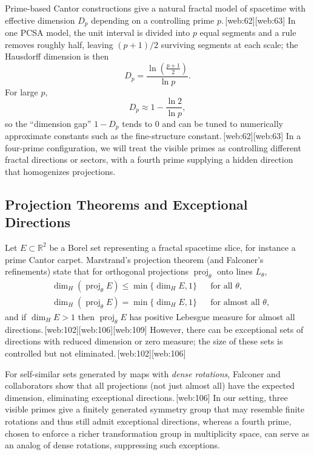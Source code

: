 \documentclass[11pt]{article}
\begin{document}
Prime-based Cantor constructions give a natural fractal model of
spacetime with effective dimension $D_p$ depending on a controlling
prime $p$.\,[web:62][web:63]
In one PCSA model, the unit interval is divided into $p$ equal segments
and a rule removes roughly half, leaving $(p+1)/2$ surviving segments at
each scale; the Hausdorff dimension is then
\begin{equation}
  D_p = \frac{\ln\left(\frac{p+1}{2}\right)}{\ln p}.
  \label{eq:Dp}
\end{equation}
For large $p$,
\[
  D_p \approx 1 - \frac{\ln 2}{\ln p},
\]
so the ``dimension gap'' $1-D_p$ tends to $0$ and can be tuned to
numerically approximate constants such as the fine-structure constant.\,[web:62][web:63]
In a four-prime configuration, we will treat the visible primes as
controlling different fractal directions or sectors, with a fourth prime
supplying a hidden direction that homogenizes projections.

\subsection{Projection Theorems and Exceptional Directions}

Let $E\subset\mathbb{R}^2$ be a Borel set representing a fractal spacetime
slice, for instance a prime Cantor carpet.
Marstrand's projection theorem (and Falconer's refinements) state that
for orthogonal projections $\operatorname{proj}_\theta$ onto lines $L_\theta$,
\begin{align}
  &\dim_H(\operatorname{proj}_\theta E) \le \min\{\dim_H E,1\}
  && \text{for all }\theta,\label{eq:marstrand-upper}\\
  &\dim_H(\operatorname{proj}_\theta E) = \min\{\dim_H E,1\}
  && \text{for almost all }\theta,\label{eq:marstrand-eq}
\end{align}
and if $\dim_H E>1$ then $\operatorname{proj}_\theta E$ has positive Lebesgue
measure for almost all directions.\,[web:102][web:106][web:109]
However, there can be exceptional sets of directions with reduced dimension
or zero measure; the size of these sets is controlled but not eliminated.\,[web:102][web:106]

For self-similar sets generated by maps with \emph{dense rotations}, Falconer
and collaborators show that all projections (not just almost all) have the
expected dimension, eliminating exceptional directions.\,[web:106]
In our setting, three visible primes give a finitely generated symmetry group
that may resemble finite rotations and thus still admit exceptional
directions, whereas a fourth prime, chosen to enforce a richer transformation
group in multiplicity space, can serve as an analog of dense rotations,
suppressing such exceptions.
\end{document}
